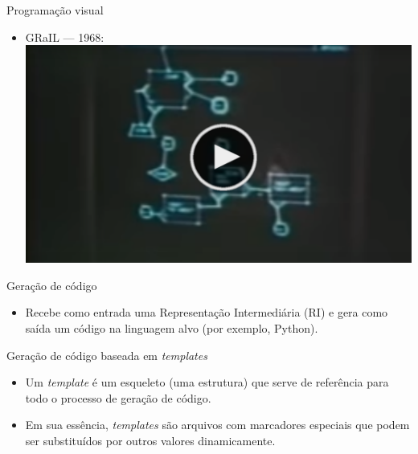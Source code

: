\begin{frame}{Programação visual} 
    \begin{itemize}
        \item GRaIL — 1968:
        \href{https://www.youtube.com/watch?v=QQhVQ1UG6aM}{
            \includegraphics[width=\textwidth, height=\textheight, keepaspectratio=true]{beamerthemesrc/images/video-thumb.png}
        }
    \end{itemize}     
\end{frame}

\begin{frame}{Geração de código}
    \begin{itemize}
        \item Recebe como entrada uma Representação Intermediária (RI) e gera como saída um código na linguagem alvo (por exemplo, Python).
    \end{itemize}    
\end{frame}

\begin{frame}{Geração de código baseada em \textit{templates}}
    \begin{itemize}
        \item Um \textit{template} é um esqueleto (uma estrutura) que serve de referência para todo o processo de geração de código.
        \item Em sua essência, \textit{templates} são arquivos com marcadores especiais que podem ser substituídos por outros valores dinamicamente.        
    \end{itemize}
\end{frame}

    
